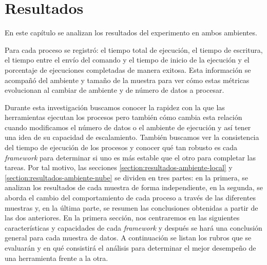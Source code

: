 \chapter{Resultados}
\label{chapter:resultados}

\noindent En este capítulo se analizan los resultados del experimento en ambos ambientes. 

Para cada proceso se registró: el tiempo total de ejecución, el tiempo de escritura, el tiempo entre el envío del comando y el tiempo de inicio de la ejecución y el porcentaje de ejecuciones completadas de manera exitosa. Esta información se acompañó del ambiente y tamaño de la muestra para ver cómo estas métricas evolucionan al cambiar de ambiente y de número de datos a procesar.

Durante esta investigación buscamos conocer la rapidez con la que las herramientas ejecutan los procesos pero también cómo cambia esta relación cuando modificamos el número de datos o el ambiente de ejecución y así tener una idea de su capacidad de escalamiento. También buscamos ver la consistencia del tiempo de ejecución de los procesos y conocer qué tan robusto es cada \textit{framework} para determinar si uno es más estable que el otro para completar las tareas. Por tal motivo, las secciones \ref{section:resultados-ambiente-local} y \ref{section:resultados-ambiente-nube} se dividen en tres partes: en la primera, se analizan los resultados de cada muestra de forma independiente, en la segunda, se aborda el cambio del comportamiento de cada proceso a través de las diferentes muestras y, en la última parte, se resumen las conclusiones obtenidas a partir de las dos anteriores. 
En la primera sección, nos centraremos en las siguientes características y capacidades de cada \textit{framework} y después se hará una conclusión general para cada muestra de datos. A continuación se listan los rubros que se evaluarán y en qué consistirá el análisis para determinar el mejor desempeño de una herramienta frente a la otra.


